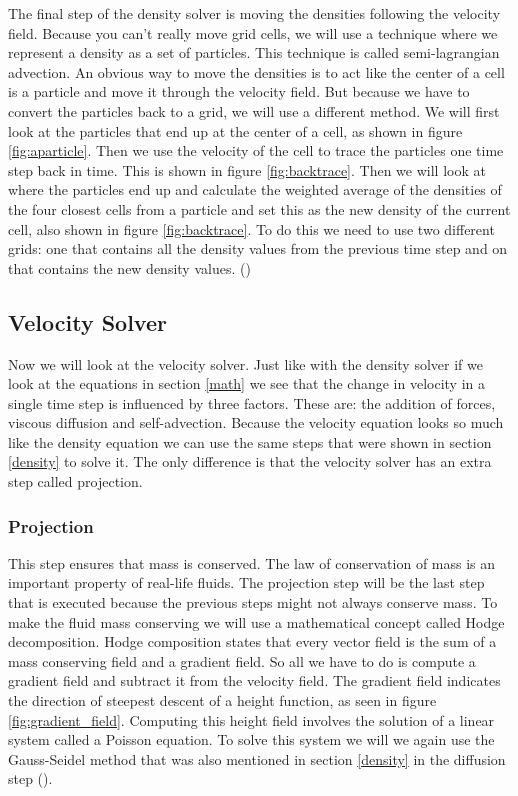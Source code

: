 \documentclass[a4paper,12pt,titlepage]{article}
\begin{document}
The final step of the density solver is moving the densities following the velocity
field. Because you can't really move grid cells, we will use a technique where we
represent a density as a set of particles. This technique is called semi-lagrangian
advection. An obvious way to move the densities is to act like the center of a
cell is a particle and move it through the velocity field. But because we have
to convert the particles back to a grid, we will use a different method. We will
first look at the particles that end up at the center of a cell, as shown in
figure \ref{fig:aparticle}. Then we use the velocity of the cell to trace the particles
one time step back in time. This is shown in figure \ref{fig:backtrace}. Then we will
look at where the particles end up and calculate the weighted average of the
densities of the four closest cells from a particle and set this as the new density
of the current cell, also shown in figure \ref{fig:backtrace}. To do this we need to use
two different grids: one that contains all the density values from the previous
time step and on that contains the new density values. (\cite{josstam})
 
\subsection{Velocity Solver} \label{velocity}
Now we will look at the velocity solver. Just like with the density solver if we
look at the equations in section \ref{math} we see that the change in velocity
in a single time step is influenced by three factors. These are: the addition of
forces, viscous diffusion and self-advection. Because the velocity equation
looks so much like the density equation we can use the same steps that were shown
in section \ref{density} to solve it. The only difference is that the velocity
solver has an extra step called projection.

\subsubsection{Projection} \label{projectionstep}
This step ensures that mass is conserved. 
The law of conservation of mass is an important property of real-life fluids.
The projection step will be the last step that is executed because the previous
steps might not always conserve mass. To make the fluid mass conserving we will
use a mathematical concept called Hodge decomposition. Hodge composition states
that every vector field is the sum of a mass conserving field and a gradient field.
So all we have to do is compute a gradient field and subtract it from the velocity
field. The gradient field indicates the direction of steepest descent of a height function, as seen in figure \ref{fig:gradient_field}.
Computing this height field involves the solution of a linear system called a Poisson equation.
To solve this system we will we again use the Gauss-Seidel method that was also mentioned in section \ref{density} in the diffusion step (\cite{josstam}).
\end{document}
